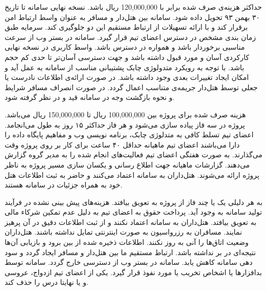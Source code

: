  حداکثر هزینه‌ی صرف شده برابر با 120,000,000 ریال باشد.
 نسخه نهایی سامانه تا تاریخ ۳۰ بهمن ۹۳ تحویل داده شود.
 سامانه بین هتل‌دار و مسافر به عنوان واسط ارتباط امن برقرار کند و با ارائه تسهیلات از ارتباط مستقیم این دو جلوگیری کند.
 سرمایه طبق زمان بندی مشخص در دسترس اعضای تیم قرار گیرد.
 سامانه در بستر وب از سرعت مناسبی برخوردار باشد و همواره در دسترس باشد. 
 واسط کاربری در نسخه نهایی کارکردی آسان  و مورد قبول داشته باشد و جهت دسترسی آسان‌تر تا حدی کم حجم باشد.
 با توجه به رویکرد متدولوژی چابک پشتیبانی مناسب از سامانه به عمل آید و امکان ایجاد تغییرات بعدی وجود داشته باشد.
 در صورت ارائه‌ی اطلاعات نادرست یا جعلی توسط هتل‌دار جریمه‌‌ی متناسب اعمال گردد.
 در صورت انصراف مسافر شرایط و نحوه بازگشت وجه در سامانه قید و در نظر گرفته شود.


 هزینه صرف شده برای پروژه بین 100,000,000 ریال تا 150,000,000 ریال می‌باشد.
 پروژه در سه فاز پیاده سازی می‌شود و هر فاز حداکثر ۱۵ روز به طول می‌انجامد.
 اعضای تیم تسلط کافی به متدلوژی چابک، برنامه نویسی وب و مفاهیم پایگاه داده را دارا می‌باشند
 اعضای تیم ماهیانه حداقل ۴۰ ساعت برای کار بر روی پروژه وقت می‌گذارند.
 به صورت هفتگی اعضای تیم فعالیت‌های انجام شده را به مدیر گروه گزارش می‌دهند.
 گزارشات ماهیانه جهت اطلاع رسانی و یکسان سازی مسیر پروژه به ناظر پروژه ارائه می‌شوند.
 هتل‌داران به سامانه اعتماد می‌کنند و حاضر به ثبت اطلاعات هتل خود به همراه جزئیات در سامانه هستند.

 به هر دلیلی یک یا چند فاز از پروژه به تعویق بیافتد.
 هزینه‌های پیش بینی نشده در فرآیند تولید سامانه به وجود آید.
 پرداخت حقوق به اعضای تیم به دلیل عدم تمکین شرکاء مالی به تعویق بیافتد.
 هتل‌داران به سامانه اعتماد نکنند و از ثبت اطلاعات دقیق در آن پرهیز نمایند.
 مسافران به رزرواسیون به صورت اینترنتی تمایل نداشته باشند.
 هتل‌داران وضعیت اتاق‌ها را آنی به روز نکنند.
 اطلاعات ذخیره شده از بین برود و بازیابی آن‌ها نتیجه‌ای در بر نداشته باشد.
 ارتباط مستقیم ما بین هتل‌دار و مسافر ایجاد گردد و سود دهی سامانه کاهش یابد.
 سامانه در بستر وب از دسترسی خارج گردد.
 سامانه توسط بدافزارها یا اشخاص تخریب یا مورد نفوذ قرار گیرد.
 یکی از اعضای تیم ازدواج، عروسی و یا نهایتا درس را حذف کند.

